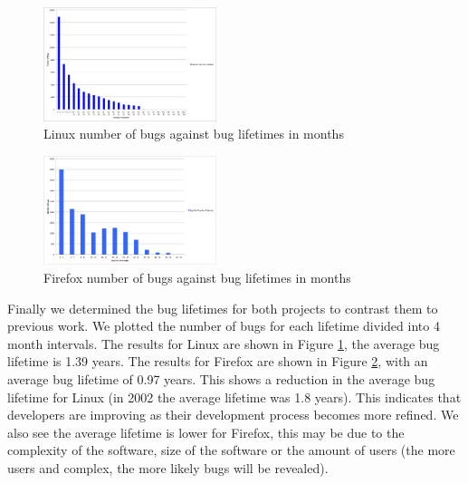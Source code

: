 \begin{figure}
\begin{center}
\includegraphics[width=0.45\textwidth]{linux_bug_life.png}
\end{center}
\caption{Linux number of bugs against bug lifetimes in months}
\label{fig-linux-buglife}
\end{figure}

\begin{figure}
\begin{center}
\includegraphics[width=0.45\textwidth]{firefox_bug_life.png}
\end{center}
\caption{Firefox number of bugs against bug lifetimes in months}
\label{fig-firefox-buglife}
\end{figure}

Finally we determined the bug lifetimes for both projects to contrast
them to previous work. We plotted the number of bugs for each lifetime
divided into 4 month intervals. The results for Linux are shown in
Figure \ref{fig-linux-buglife}, the average bug lifetime is 1.39
years. The results for Firefox are shown in Figure
\ref{fig-firefox-buglife}, with an average bug lifetime of 0.97
years. This shows a reduction in the average bug lifetime for Linux (in
2002 the average lifetime was 1.8 years). This indicates that
developers are improving as their development process becomes more
refined. We also see the average lifetime is lower for Firefox, this
may be due to the complexity of the software, size of the software or
the amount of users (the more users and complex, the more likely bugs will be
revealed).


